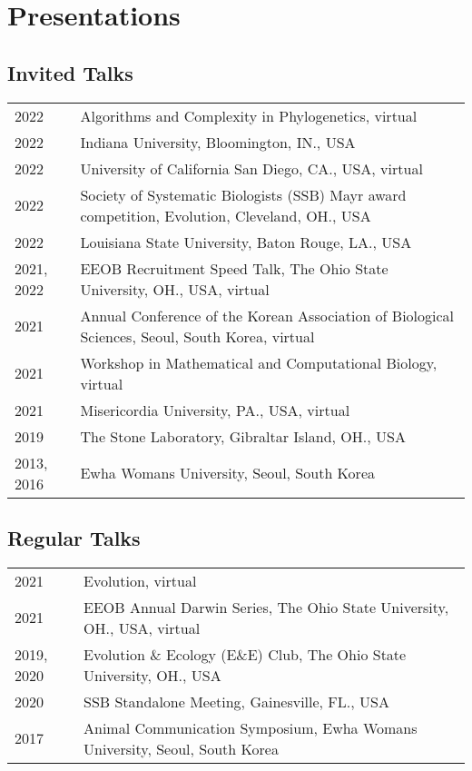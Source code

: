 \documentclass[11pt]{article}
\begin{document}











\section*{Presentations}

\subsection*{Invited Talks}
\begin{longtable}{p{}  p{}}
2022 & Algorithms and Complexity in Phylogenetics, virtual\\
2022 & Indiana University, Bloomington, IN., USA\\
2022 & University of California San Diego, CA., USA, virtual\\
2022 & Society of Systematic Biologists (SSB) Mayr award competition, Evolution, Cleveland, OH., USA\\
2022 & Louisiana State University, Baton Rouge, LA., USA\\
2021, 2022 & EEOB Recruitment Speed Talk, The Ohio State University, OH., USA, virtual\\
2021 & Annual Conference of the Korean Association of Biological Sciences, Seoul, South Korea, virtual \\
2021 & Workshop in Mathematical and Computational Biology, virtual\\
2021 & Misericordia University, PA., USA, virtual\\
2019 & The Stone Laboratory, Gibraltar Island, OH., USA \\
2013, 2016 & Ewha Womans University, Seoul, South Korea 
\end{longtable}

\subsection*{Regular Talks}
\begin{longtable}{p{}  p{}}
2021 & Evolution, virtual\\
2021 & EEOB Annual Darwin Series, The Ohio State University, OH., USA, virtual \\
2019, 2020 & Evolution \& Ecology (E\&E) Club, The Ohio State University, OH., USA \\
2020 & SSB Standalone Meeting, Gainesville, FL., USA \\
2017 & Animal Communication Symposium, Ewha Womans University, Seoul, South Korea\\
\end{longtable}
\end{document}
